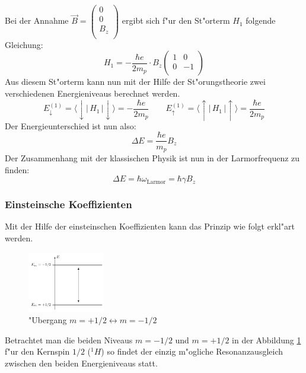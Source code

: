 Bei der Annahme $\vec{B} = \begin{pmatrix}
0 \\
0 \\
B_z \\
\end{pmatrix}$ ergibt sich f"ur den St"orterm $H_1$ folgende Gleichung:
\begin{equation}
H_1 = -\frac{\hbar e}{2m_p} \cdot B_z \begin{pmatrix}
1 & 0 \\
0 & -1 \\
\end{pmatrix}
\end{equation}
Aus diesem St"orterm kann nun mit der Hilfe der St"orungstheorie zwei verschiedenen Energieniveaus berechnet werden.
\begin{equation}
E_\downarrow^{(1)}
=
\langle \downarrow|\, H_1 \,|\downarrow\rangle
=-\frac{\hbar e}{2m_p}
\qquad
E_\uparrow^{(1)}
=
\langle \uparrow|\, H_1 \,|\uparrow\rangle
=\frac{\hbar e}{2m_p}
\end{equation}
Der Energieunterschied ist nun also:
\begin{equation}
\Delta E = \frac{\hbar e}{m_p}B_z
\end{equation}
Der Zusammenhang mit der klassischen Physik ist nun in der Larmorfrequenz  zu finden:
\begin{equation}
\Delta E = \hbar \omega_{\text{Larmor}}=\hbar \gamma B_z
\end{equation}

\subsubsection{Einsteinsche Koeffizienten}
Mit der Hilfe der einsteinschen Koeffizienten kann das Prinzip wie folgt erkl"art werden.
\begin{figure}
	\centering
	\includegraphics[width= 0.3\textwidth]{./mri/pic/einsteinischeKoeffizienten}
	\caption{"Ubergang $m=+1/2 \longleftrightarrow m=-1/2$}
	\label{mri:relax}
\end{figure}
Betrachtet man die beiden Niveaus $m= -1/2$ und $m= +1/2$ in der Abbildung \ref{mri:relax} f"ur den Kernspin $1/2$ ($^1H$) so findet der einzig m"ogliche Resonanzausgleich zwischen den beiden Energieniveaus statt. 

